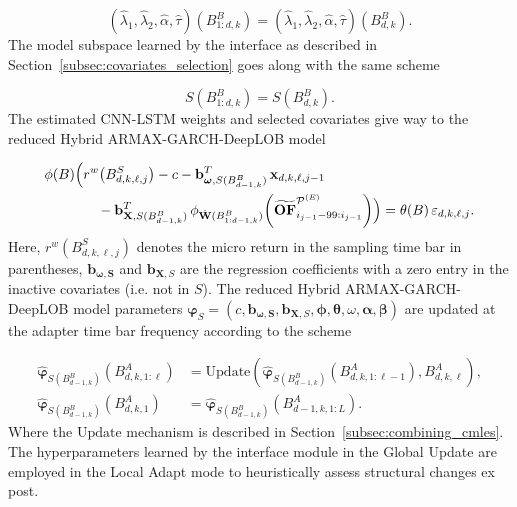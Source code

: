 \documentclass[10pt,a4paper,oneside]{article}
\begin{document}
$$
(\hat{\lambda}_1, \hat{\lambda}_2, \hat{\alpha}, \hat{\tau})(B^{B}_{1:d, k}) = (\hat{\lambda}_1, \hat{\lambda}_2, \hat{\alpha}, \hat{\tau})(B^{B}_{d, k}).
$$
The model subspace learned by the interface as described in Section~\ref{subsec:covariates_selection} goes along with the same scheme

$$
S(B^B_{1:d, k}) = S(B^B_{d, k}).
$$
The estimated CNN-LSTM weights and selected covariates give way to the reduced Hybrid ARMAX-GARCH-DeepLOB model

\begin{align*}
\phi(B)\Bigl(&r^w\bigl(B^{S}_{d,k,\ell,j}\bigr) - c 
    - \mathbf{b}_{\boldsymbol{\omega}, S(B^B_{d-1,k})}^{T}\,\mathbf{x}_{d,k,\ell,j-1} \notag\\
    &\quad - \mathbf{b}^T_{\mathbf{X}, S(B^B_{d-1,k})}\,
      \phi_{\hat{\mathbf{W}}(B^B_{1:d-1,k})}\!\left(\widetilde{\mathbf{OF}}^{\mathcal{P}^{(E)}}_{i_{j-1}-99:i_{j-1}}\right)
\Bigr) = \theta(B)\,\varepsilon_{d,k,\ell,j}.
\end{align*}
Here, $r^w(B^{S}_{d,k,\ell,j})$ denotes the micro return in the sampling time bar in parentheses, $\mathbf{b}_{\boldsymbol{\omega, S}}$ and $\mathbf{b}_{\mathbf{X}, S}$ are the regression coefficients with a zero entry in the inactive covariates (i.e. not in $S$). The reduced Hybrid ARMAX-GARCH-DeepLOB model parameters $\boldsymbol{\varphi}_{S} = (c, \mathbf{b}_{\boldsymbol{\omega, S}}, \mathbf{b}_{\mathbf{X}, S}, \boldsymbol{\phi}, \boldsymbol{\theta}, \omega, \boldsymbol{\alpha}, \boldsymbol{\beta})$ are updated at the adapter time bar frequency according to the scheme

\begin{align*}
    \hat{\boldsymbol{\varphi}}_{S(B^B_{d-1,k})}\left(B^A_{d,k,1:\ell} \right) &= \mathrm{Update}\left(\hat{\boldsymbol{\varphi}}_{S(B^B_{d-1,k})}\left(B^A_{d,k,1:\ell-1} \right), B^A_{d,k,\ell}\right),\\
    \hat{\boldsymbol{\varphi}}_{S(B^B_{d-1,k})}\left(B^A_{d,k,1} \right) &= \hat{\boldsymbol{\varphi}}_{S(B^B_{d-1,k})}\left(B^A_{d - 1,k,1:L} \right).
\end{align*}
Where the $\mathrm{Update}$ mechanism is described in Section~\ref{subsec:combining_cmles}. The hyperparameters learned by the interface module in the Global Update are employed in the Local Adapt mode to heuristically assess structural changes ex post.

\end{document}
